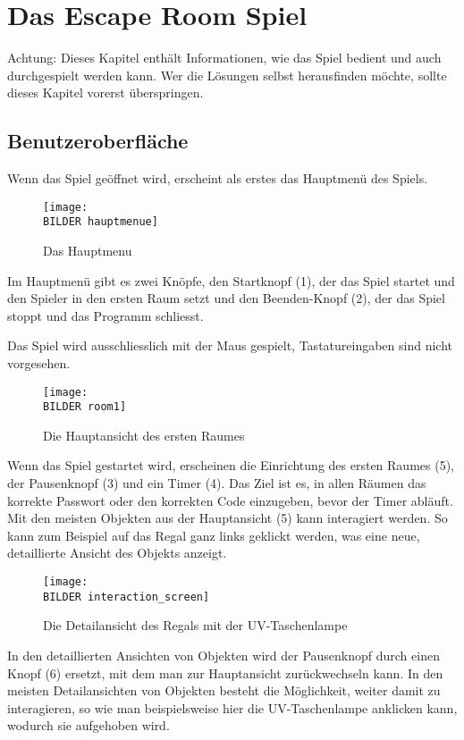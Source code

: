 \section{Das Escape Room Spiel}

Achtung: Dieses Kapitel enthält Informationen, wie das Spiel bedient und auch durchgespielt werden kann. Wer die Lösungen selbst herausfinden möchte, sollte dieses Kapitel vorerst überspringen.

\subsection{Benutzeroberfläche}
Wenn das Spiel geöffnet wird, erscheint als erstes das Hauptmenü des Spiels.

\begin{figure}[htb]
	\centering
		\texttt{[image: \\BILDER hauptmenue]}
 	\caption{Das Hauptmenu}
  \label{fig:hauptmenu}
\end{figure}

 
Im Hauptmenü gibt es zwei Knöpfe, den Startknopf (1), der das Spiel startet und den Spieler in den ersten Raum setzt und den Beenden-Knopf (2), der das Spiel stoppt und das Programm schliesst.

Das Spiel wird ausschliesslich mit der Maus gespielt, Tastatureingaben sind nicht vorgesehen. \newpage

\begin{figure}[h!]
	\centering
		\texttt{[image: \\BILDER room1]}
 	\caption{Die Hauptansicht des ersten Raumes}
  \label{fig:hauptansicht}
\end{figure}

Wenn das Spiel gestartet wird, erscheinen die Einrichtung des ersten Raumes (5), der Pausenknopf (3) und ein Timer (4). Das Ziel ist es, in allen Räumen das korrekte Passwort oder den korrekten Code einzugeben, bevor der Timer abläuft. Mit den meisten Objekten aus der Hauptansicht (5) kann interagiert werden. So kann zum Beispiel auf das Regal ganz links geklickt werden, was eine neue, detaillierte Ansicht des Objekts anzeigt.

\begin{figure}[h!]
	\centering
		\texttt{[image: \\BILDER interaction\_screen]}
 	\caption{Die Detailansicht des Regals mit der UV-Taschenlampe}
  \label{fig:detailansicht}
\end{figure}

In den detaillierten Ansichten von Objekten wird der Pausenknopf durch einen Knopf (6) ersetzt, mit dem man zur Hauptansicht zurückwechseln kann. In den meisten Detailansichten von Objekten besteht die Möglichkeit, weiter damit zu interagieren, so wie man beispielsweise hier die UV-Taschenlampe anklicken kann, wodurch sie aufgehoben wird.

